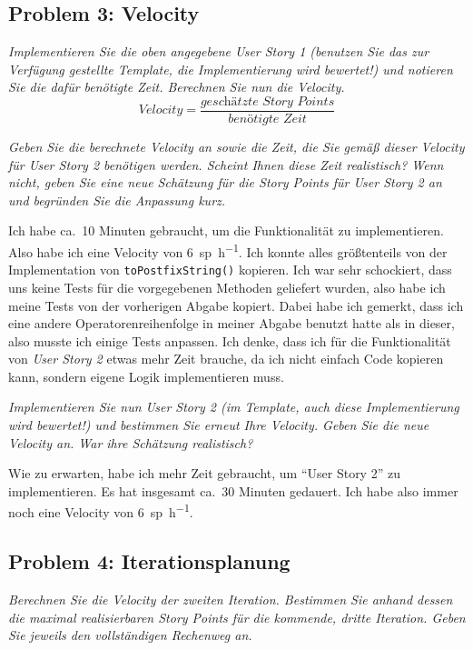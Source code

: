 \documentclass[
  ngerman,
  DIV=14
]{scrartcl}
\begin{document}
\subsection*{Problem 3: Velocity}
\emph{Implementieren Sie die oben angegebene User Story 1 (benutzen Sie das zur Verfügung gestellte Template, die Implementierung wird bewertet!) und notieren Sie die dafür benötigte Zeit. Berechnen Sie nun die Velocity.}
\begin{equation*}
\textit{Velocity} = \frac{\textit{geschätzte Story Points}}{\textit{benötigte Zeit}}  
\end{equation*}

\medskip\noindent
\emph{Geben Sie die berechnete Velocity an sowie die Zeit, die Sie gemäß dieser Velocity für User Story 2 benötigen werden. Scheint Ihnen diese Zeit realistisch? Wenn nicht, geben Sie eine neue Schätzung für die Story Points für User Story 2 an und begründen Sie die Anpassung kurz.}

\medskip\noindent
Ich habe ca.\ 10 Minuten gebraucht, um die Funktionalität zu implementieren. Also habe ich eine Velocity von \SI{6}{sp\per\hour}. Ich konnte alles größtenteils von der Implementation von \texttt{toPostfixString()} kopieren. Ich war sehr schockiert, dass uns keine Tests für die vorgegebenen Methoden geliefert wurden, also habe ich meine Tests von der vorherigen Abgabe kopiert. Dabei habe ich gemerkt, dass ich eine andere Operatorenreihenfolge in meiner Abgabe benutzt hatte als in dieser, also musste ich einige Tests anpassen. Ich denke, dass ich für die Funktionalität von \emph{User Story 2} etwas mehr Zeit brauche, da ich nicht einfach Code kopieren kann, sondern eigene Logik implementieren muss. 

\bigskip\noindent
\emph{Implementieren Sie nun User Story 2 (im Template, auch diese Implementierung wird bewertet!) und bestimmen Sie erneut Ihre Velocity. Geben Sie die neue Velocity an. War ihre Schätzung realistisch?}

\medskip\noindent
Wie zu erwarten, habe ich mehr Zeit gebraucht, um \enquote{User Story 2} zu implementieren. Es hat insgesamt ca.\ 30 Minuten gedauert. Ich habe also immer noch eine Velocity von \SI{6}{sp\per\hour}. 

\subsection*{Problem 4: Iterationsplanung}
\emph{Berechnen Sie die Velocity der zweiten Iteration.
Bestimmen Sie anhand dessen die maximal realisierbaren Story Points für die kommende, dritte Iteration. Geben Sie jeweils den vollständigen Rechenweg an.}
\end{document}
